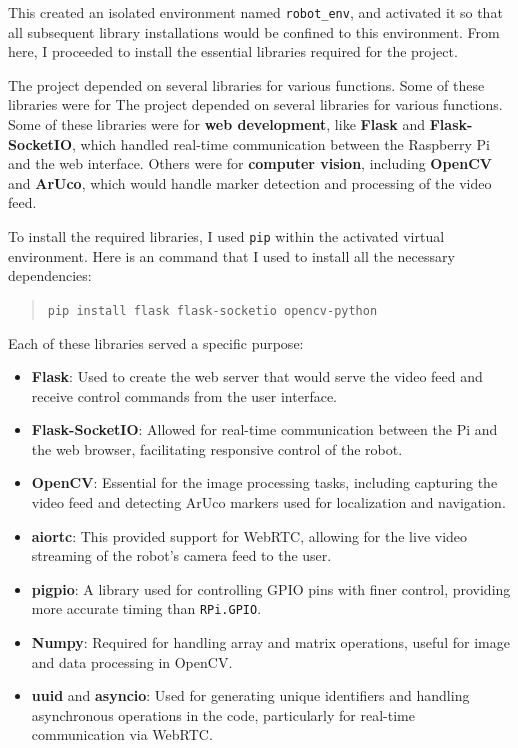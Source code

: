 This created an isolated environment named \texttt{robot\_env}, and activated it so that all subsequent library installations would be confined to this environment. From here, I proceeded to install the essential libraries required for the project.


The project depended on several libraries for various functions. Some of these libraries were for The project depended on several libraries for various functions. Some of these libraries were for \textbf{web development}, like \textbf{Flask} and \textbf{Flask-SocketIO}, which handled real-time communication between the Raspberry Pi and the web interface. Others were for \textbf{computer vision}, including \textbf{OpenCV} and \textbf{ArUco}, which would handle marker detection and processing of the video feed.


To install the required libraries, I used \texttt{pip} within the activated virtual environment. Here is an  command that I used to install all the necessary dependencies:

\begin{quote}
	\texttt{pip install flask flask-socketio opencv-python}
\end{quote}

Each of these libraries served a specific purpose:
\begin{itemize}
	\item \textbf{Flask}: Used to create the web server that would serve the video feed and receive control commands from the user interface.
	\item \textbf{Flask-SocketIO}: Allowed for real-time communication between the Pi and the web browser, facilitating responsive control of the robot.
	\item \textbf{OpenCV}: Essential for the image processing tasks, including capturing the video feed and detecting ArUco markers used for localization and navigation.
	\item \textbf{aiortc}: This provided support for WebRTC, allowing for the live video streaming of the robot’s camera feed to the user.
	\item \textbf{pigpio}: A library used for controlling GPIO pins with finer control, providing more accurate timing than \texttt{RPi.GPIO}.
	\item \textbf{Numpy}: Required for handling array and matrix operations, useful for image and data processing in OpenCV.
	\item \textbf{uuid} and \textbf{asyncio}: Used for generating unique identifiers and handling asynchronous operations in the code, particularly for real-time communication via WebRTC.
\end{itemize}

